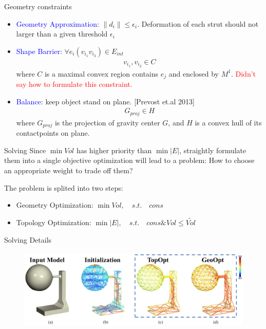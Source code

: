 \documentclass{beamer}
\begin{document}
\begin{frame}{Geometry constraints}
\begin{itemize}
\item \textcolor{blue}{Geometry Approximation}: $\|d_i\|\leq \epsilon_i$. Deformation of each strut should not larger than a given threshold $\epsilon_i$
\item \textcolor{blue}{Shape Barrier}: $\forall e_i(v_{i_1}v_{i_2})\in E_{int}$
\begin{eqnarray}
v_{i_1},v_{i_2}\in C
\end{eqnarray}
where $C$ is a maximal convex region contains $e_j$ and enclosed by $M^1$. \textcolor{red}{Didn't say how to formulate this constraint.}
\item \textcolor{blue}{Balance}: keep object stand on plane. [Prevost et.al 2013]
\begin{eqnarray}
G_{proj}\in H
\end{eqnarray}
where $G_{proj}$ is the projection of gravity center $G$, and $H$ is a convex hull of its contactpoints on plane.
\end{itemize}
\end{frame}

\begin{frame}{Solving}
Since $\min Vol$ has higher priority than $\min |E|$, straightly formulate them into a single objective optimization will lead to a problem: How to choose an appropriate weight to trade off them?

The problem is splited into two steps:
\begin{itemize}
\item Geometry Optimization:  $\min Vol, \quad s.t.\quad cons$ 
\item Topology Optimization:  $\min |E|, \quad s.t. \quad cons \& Vol\leq \tilde{Vol}$
\end{itemize}
\end{frame}


\begin{frame}{Solving Details}
\begin{figure}[!htb]
\centering
\includegraphics[height=1.5in]{./img/pipeline.png}
\end{figure}
\end{frame}
\end{document}
